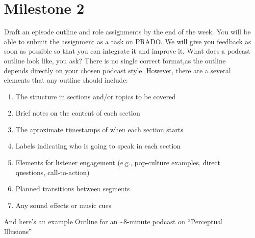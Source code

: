 \documentclass[
  letterpaper,
  DIV=11,
  numbers=noendperiod]{scrreprt}
\providecommand{\tightlist}{%
  \setlength{\itemsep}{0pt}\setlength{\parskip}{0pt}}\usepackage{longtable,booktabs,array}
\begin{document}
\section{Milestone 2}\label{milestone-2}

Draft an episode outline and role assignments by the end of the week.
You will be able to submit the assignment as a task on PRADO. We will
give you feedback as soon as possible so that you can integrate it and
improve it. What does a podcast outline look like, you ask? There is no
single correct format,as the outline depends directly on your chosen
podcast style. However, there are a several elements that any outline
should include:

\begin{enumerate}
\def\labelenumi{\arabic{enumi}.}
\tightlist
\item
  The structure in sections and/or topics to be covered
\item
  Brief notes on the content of each section
\item
  The aproximate timestamps of when each section starts
\item
  Labels indicating who is going to speak in each section
\item
  Elements for listener engagement (e.g., pop-culture examples, direct
  questions, call-to-action)
\item
  Planned transitions between segments
\item
  Any sound effects or music cues
\end{enumerate}

And here's an example Outline for an \textasciitilde8-minute podcast on
``Perceptual Illusions''
\end{document}
